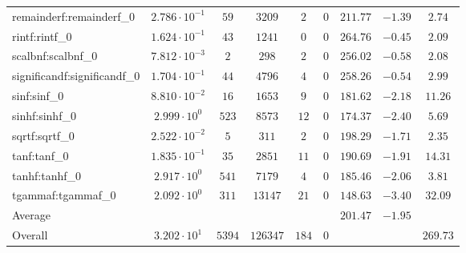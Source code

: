 \begin{tabular}{|l|c|c|c|c|c|c|c|c|}
remainderf:remainderf\_0     & $ 2.786 \cdot 10^{-1} $ & $ 59     $ & $ 3209   $ & $ 2   $ & $ 0   $ & $ 211.77      $ & $ -1.39   $ & $ 2.74    $ \\
rintf:rintf\_0               & $ 1.624 \cdot 10^{-1} $ & $ 43     $ & $ 1241   $ & $ 0   $ & $ 0   $ & $ 264.76      $ & $ -0.45   $ & $ 2.09    $ \\
scalbnf:scalbnf\_0           & $ 7.812 \cdot 10^{-3} $ & $ 2      $ & $ 298    $ & $ 2   $ & $ 0   $ & $ 256.02      $ & $ -0.58   $ & $ 2.08    $ \\
significandf:significandf\_0 & $ 1.704 \cdot 10^{-1} $ & $ 44     $ & $ 4796   $ & $ 4   $ & $ 0   $ & $ 258.26      $ & $ -0.54   $ & $ 2.99    $ \\
sinf:sinf\_0                 & $ 8.810 \cdot 10^{-2} $ & $ 16     $ & $ 1653   $ & $ 9   $ & $ 0   $ & $ 181.62      $ & $ -2.18   $ & $ 11.26   $ \\
sinhf:sinhf\_0               & $ 2.999 \cdot 10^{0}  $ & $ 523    $ & $ 8573   $ & $ 12  $ & $ 0   $ & $ 174.37      $ & $ -2.40   $ & $ 5.69    $ \\
sqrtf:sqrtf\_0               & $ 2.522 \cdot 10^{-2} $ & $ 5      $ & $ 311    $ & $ 2   $ & $ 0   $ & $ 198.29      $ & $ -1.71   $ & $ 2.35    $ \\
tanf:tanf\_0                 & $ 1.835 \cdot 10^{-1} $ & $ 35     $ & $ 2851   $ & $ 11  $ & $ 0   $ & $ 190.69      $ & $ -1.91   $ & $ 14.31   $ \\
tanhf:tanhf\_0               & $ 2.917 \cdot 10^{0}  $ & $ 541    $ & $ 7179   $ & $ 4   $ & $ 0   $ & $ 185.46      $ & $ -2.06   $ & $ 3.81    $ \\
tgammaf:tgammaf\_0           & $ 2.092 \cdot 10^{0}  $ & $ 311    $ & $ 13147  $ & $ 21  $ & $ 0   $ & $ 148.63      $ & $ -3.40   $ & $ 32.09   $ \\
\hline
Average                      & $                     $ & $        $ & $        $ & $     $ & $     $ & $ 201.47      $ & $ -1.95   $ & $         $ \\
\hline
Overall                      & $ 3.202 \cdot 10^{1}  $ & $ 5394   $ & $ 126347 $ & $ 184 $ & $ 0   $ & $             $ & $         $ & $ 269.73  $ \\
\hline
\end{tabular}
